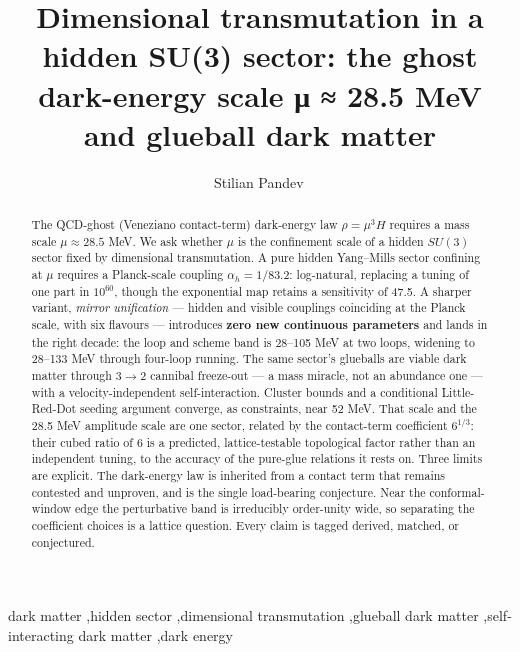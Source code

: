 \documentclass[preprint,12pt]{elsarticle}
\begin{document}
\begin{frontmatter}

\title{Dimensional transmutation in a hidden SU(3) sector: the ghost
dark-energy scale μ ≈ 28.5 MeV and glueball dark matter}

\author[ind]{Stilian Pandev\,}
\address[ind]{Independent researcher}

\begin{abstract}
The QCD-ghost (Veneziano contact-term) dark-energy law
\(\rho = \mu^3 H\) requires a mass scale \(\mu \approx 28.5\) MeV. We
ask whether \(\mu\) is the confinement scale of a hidden \(SU(3)\)
sector fixed by dimensional transmutation. A pure hidden Yang--Mills
sector confining at \(\mu\) requires a Planck-scale coupling
\(\alpha_h = 1/83.2\): log-natural, replacing a tuning of one part in
\(10^{60}\), though the exponential map retains a sensitivity of 47.5. A
sharper variant, \emph{mirror unification} --- hidden and visible
couplings coinciding at the Planck scale, with six flavours ---
introduces \textbf{zero new continuous parameters} and lands in the
right decade: the loop and scheme band is 28--105 MeV at two loops,
widening to 28--133 MeV through four-loop running. The same sector's
glueballs are viable dark matter through \(3\to2\) cannibal freeze-out
--- a mass miracle, not an abundance one --- with a velocity-independent
self-interaction. Cluster bounds and a conditional Little-Red-Dot
seeding argument converge, as constraints, near 52 MeV. That scale and
the 28.5 MeV amplitude scale are one sector, related by the contact-term
coefficient \(6^{1/3}\): their cubed ratio of 6 is a predicted,
lattice-testable topological factor rather than an independent tuning,
to the accuracy of the pure-glue relations it rests on. Three limits are
explicit. The dark-energy law is inherited from a contact term that
remains contested and unproven, and is the single load-bearing
conjecture. Near the conformal-window edge the perturbative band is
irreducibly order-unity wide, so separating the coefficient choices is a
lattice question. Every claim is tagged derived, matched, or
conjectured.
\end{abstract}

\begin{keyword}
dark matter \sep hidden sector \sep dimensional transmutation \sep glueball dark
matter \sep self-interacting dark matter \sep dark energy
\end{keyword}

\end{frontmatter}
\end{document}
